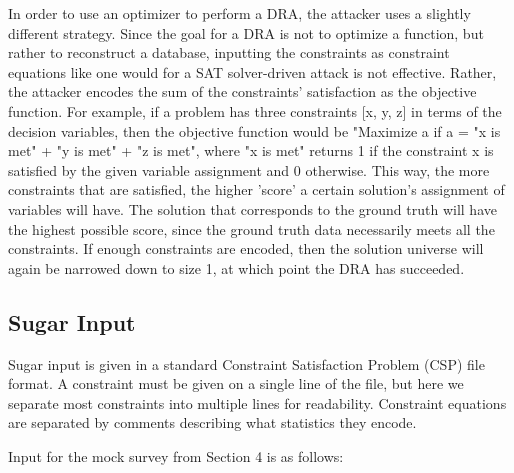 \documentclass[5p,times,11pt]{elsarticle}
\begin{document}
In order to use an optimizer to perform a DRA, the attacker uses a slightly different strategy. Since the goal for a DRA is not to optimize a function, but rather to reconstruct a database, inputting the constraints as constraint equations like one would for a SAT solver-driven attack is not effective. Rather, the attacker encodes the sum of the constraints' satisfaction as the objective function. For example, if a problem has three constraints [x, y, z] in terms of the decision variables, then the objective function would be "Maximize a if a = "x is met" + "y is met" + "z is met", where "x is met" returns 1 if the constraint x is satisfied by the given variable assignment and 0 otherwise. This way, the more constraints that are satisfied, the higher 'score' a certain solution's assignment of variables will have. The solution that corresponds to the ground truth will have the highest possible score, since the ground truth data necessarily meets all the constraints. If enough constraints are encoded, then the solution universe will again be narrowed down to size 1, at which point the DRA has succeeded.

\subsection{Sugar Input}

Sugar input is given in a standard Constraint Satisfaction Problem (CSP) file format. A constraint must be given on a single line of the file, but here we separate most constraints into multiple lines for readability. Constraint equations are separated by comments describing what statistics they encode.

Input for the mock survey from Section 4 is as follows:
\end{document}
